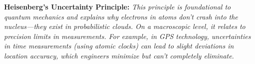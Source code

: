 \documentclass[a4paper,12pt]{article}
\begin{document}
\textbf{Heisenberg’s Uncertainty Principle:} \textit{This principle is foundational to quantum mechanics and explains why electrons in atoms don't crash into the nucleus—they exist in probabilistic clouds. On a macroscopic level, it relates to precision limits in measurements. For example, in GPS technology, uncertainties in time measurements (using atomic clocks) can lead to slight deviations in location accuracy, which engineers minimize but can't completely eliminate.}


%
%

%
%	
	
\end{document}
